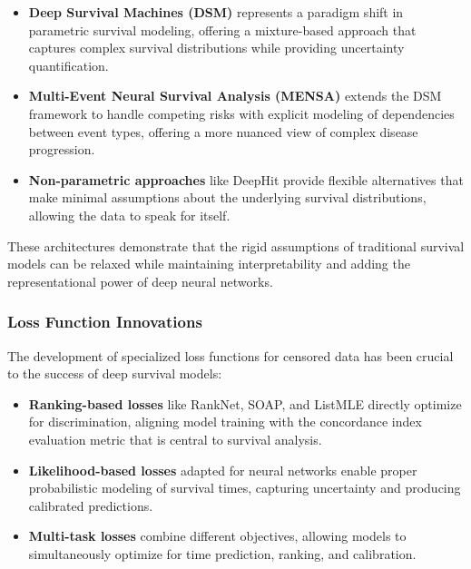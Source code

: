 \begin{itemize}
    \item \textbf{Deep Survival Machines (DSM)} represents a paradigm shift in parametric survival modeling, offering a mixture-based approach that captures complex survival distributions while providing uncertainty quantification.
    
    \item \textbf{Multi-Event Neural Survival Analysis (MENSA)} extends the DSM framework to handle competing risks with explicit modeling of dependencies between event types, offering a more nuanced view of complex disease progression.
    
    \item \textbf{Non-parametric approaches} like DeepHit provide flexible alternatives that make minimal assumptions about the underlying survival distributions, allowing the data to speak for itself.
\end{itemize}

These architectures demonstrate that the rigid assumptions of traditional survival models can be relaxed while maintaining interpretability and adding the representational power of deep neural networks.

\subsubsection{Loss Function Innovations}

The development of specialized loss functions for censored data has been crucial to the success of deep survival models:

\begin{itemize}
    \item \textbf{Ranking-based losses} like RankNet, SOAP, and ListMLE directly optimize for discrimination, aligning model training with the concordance index evaluation metric that is central to survival analysis.
    
    \item \textbf{Likelihood-based losses} adapted for neural networks enable proper probabilistic modeling of survival times, capturing uncertainty and producing calibrated predictions.
    
    \item \textbf{Multi-task losses} combine different objectives, allowing models to simultaneously optimize for time prediction, ranking, and calibration.
\end{itemize}

